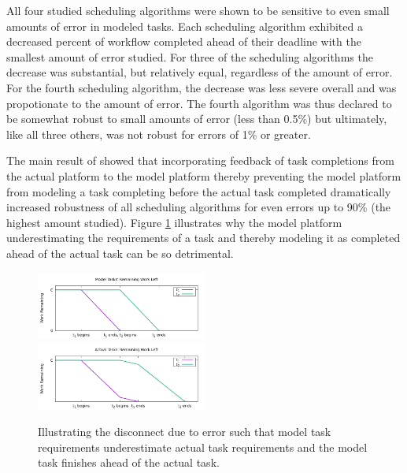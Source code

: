 \documentclass[10pt]{csce}
\begin{document}
All four studied scheduling algorithms were shown to be sensitive to
even small amounts of error in modeled tasks.  Each scheduling algorithm
exhibited a decreased percent of workflow completed ahead of their deadline
with the smallest amount of error studied.  For three of the scheduling
algorithms the decrease was substantial, but relatively equal, regardless of
the amount of error.  For the fourth scheduling algorithm, the decrease was
less severe overall and was propotionate to the amount of error.  The
fourth algorithm was thus declared to be somewhat robust to small amounts of
error (less than 0.5\%) but ultimately, like all three others, was not
robust for errors of 1\% or greater.

The main result of \cite{pdpta18} showed that incorporating feedback of
task completions from the actual platform to the model platform thereby
preventing the model platform from modeling a task completing before the
actual task completed dramatically increased robustness of all scheduling
algorithms for even errors up to 90\% (the highest amount studied).  Figure
\ref{fig:underestimating} illustrates why the model platform underestimating
the requirements of a task and thereby modeling it as completed ahead of the
actual task can be so detrimental.

\begin{figure}
	\begin{center}
		\includegraphics[width=0.5\textwidth]{figures/UnderestimatedErrorEffect_ModelTaskWork.pdf}
		\includegraphics[width=0.5\textwidth]{figures/UnderestimatedErrorEffect_ActualTaskWork.pdf}
	\end{center}
	\caption{Illustrating the disconnect due to error such that model task
		requirements underestimate actual task requirements and the model
		task finishes ahead of the actual task.}
	\label{fig:underestimating}
\end{figure}
\end{document}
